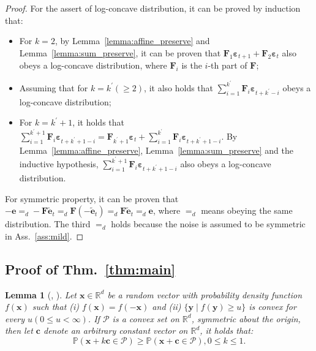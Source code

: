 \documentclass{article}
\theoremstyle{plain}
\newtheorem{lemma}[theorem]{Lemma}
\theoremstyle{definition}
\theoremstyle{remark}
\def \thm {Thm.}
\def \F {\mathbf{F}}
\def \e {\mathbf{e}}
\begin{document}
\begin{proof}
  For the assert of log-concave distribution, it can be proved by induction that:
  \vspace{-0.1in}
  \begin{itemize}[leftmargin=16pt, itemsep=-0.05in]
    \item For \(k=2\), by Lemma~\ref{lemma:affine_preserve} and Lemma~\ref{lemma:sum_preserve}, it can be proven that \(\F_1\bm{\varepsilon}_{t+1} + \F_2 \bm{\varepsilon}_{t} \) also obeys a log-concave distribution, where \(\F_i\) is the \(i\)-th part of \(\F\); 
    \item Assuming that for \(k = k^\prime(\geq 2)\), it also holds that \(\sum_{i=1}^{k^\prime} \F_i\bm{\varepsilon}_{t+k^\prime-i}\) obeys a log-concave distribution;
    \item For \(k = k^\prime + 1\), it holds that \(\sum_{i=1}^{k^\prime+1} \F_i\bm{\varepsilon}_{t+k^\prime+1-i} = \F_{k^\prime+1}\bm{\varepsilon}_{t} + \sum_{i=1}^{k^\prime} \F_i\bm{\varepsilon}_{t+k^\prime+1-i}\). By Lemma~\ref{lemma:affine_preserve}, Lemma~\ref{lemma:sum_preserve} and the inductive hypothesis, \(\sum_{i=1}^{k^\prime+1} \F_i\bm{\varepsilon}_{t+k^\prime+1-i}\) also obeys a log-concave distribution. 
  \end{itemize}
  \vspace{-0.1in}
  For symmetric property, it can be proven that \(-\e =_d -\F\tilde{\e}_t =_d \F(-\tilde{\e}_t) =_d \F\tilde{\e}_t =_d \e\), where \(=_d\) means obeying the same distribution. The third \(=_d\) holds because the noise is assumed to be symmetric in Ass.~\ref{ass:mild}. 
\end{proof}

\subsection{Proof of \thm~\ref{thm:main}}

\begin{lemma}[\citeauthor{anderson1955integral}, \citeyear{anderson1955integral}]
  \label{lemma:anderson}
  Let \(\boldsymbol{x}\in\mathbb{R}^{d}\) be a random vector with probability density function \(f(\boldsymbol{x})\) such that
(i) \(f(\boldsymbol{x})=f(-\boldsymbol{x})\) and (ii) \(\{\boldsymbol{y} \mid f(\boldsymbol{y}) \geq u\}\) is convex for every \(u (0 \leq u< \infty)\). 
If $\mathcal{P}$ is a convex set on \(\mathbb{R}^{d}\), symmetric about the origin, then let \(\boldsymbol{c}\) denote an arbitrary constant vector on \(\mathbb{R}^{d}\), it holds that:
\[
  \mathbb{P}\left(\boldsymbol{x} + k\boldsymbol{c} \in \mathcal{P}\right) \geq \mathbb{P}\left(\boldsymbol{x} + \boldsymbol{c}\in \mathcal{P}\right), 0 \leq k \leq 1.
\]
\end{lemma}
\end{document}
